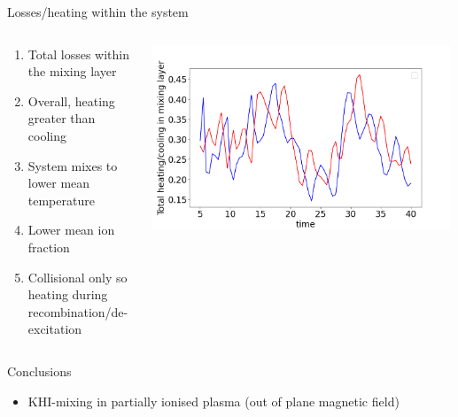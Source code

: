 \documentclass[10pt,aspectratio=169,usenames,dvipsnames]{beamer}
\begin{document}
\begin{frame}{Losses/heating within the system}
\begin{columns}
\begin{column}{0.5\textwidth}
\begin{enumerate}
\item Total losses within the mixing layer
\item Overall, heating greater than cooling
\item System mixes to lower mean temperature 
\item Lower mean ion fraction
\item Collisional only so heating during recombination/de-excitation
\end{enumerate}
\end{column}
\begin{column}{0.5\textwidth}
\includegraphics[width=0.99\textwidth]{2023Mixing/Figures/KHInlev_losstimeplot.png}
\end{column}
\end{columns}
\end{frame}

\begin{frame}{Conclusions}
\begin{itemize}
    \item KHI-mixing in partially ionised plasma (out of plane magnetic field)
\end{itemize}
\end{frame}
\end{document}
